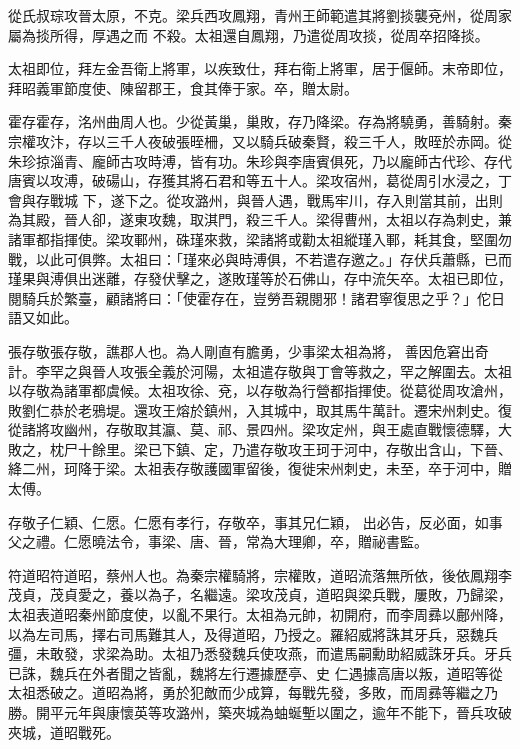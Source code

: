 \begin{pinyinscope}
 從氏叔琮攻晉太原，不克。梁兵西攻鳳翔，青州王師範遣其將劉掞襲兗州，從周家屬為掞所得，厚遇之而
 不殺。太祖還自鳳翔，乃遣從周攻掞，從周卒招降掞。



 太祖即位，拜左金吾衛上將軍，以疾致仕，拜右衛上將軍，居于偃師。末帝即位，拜昭義軍節度使、陳留郡王，食其俸于家。卒，贈太尉。



 霍存霍存，洺州曲周人也。少從黃巢，巢敗，存乃降梁。存為將驍勇，善騎射。秦宗權攻汴，存以三千人夜破張晊柵，又以騎兵破秦賢，殺三千人，敗晊於赤岡。從朱珍掠淄青、龐師古攻時溥，皆有功。朱珍與李唐賓俱死，乃以龐師古代珍、存代唐賓以攻溥，破碭山，存獲其將石君和等五十人。梁攻宿州，葛從周引水浸之，丁會與存戰城
 下，遂下之。從攻潞州，與晉人遇，戰馬牢川，存入則當其前，出則為其殿，晉人卻，遂東攻魏，取淇門，殺三千人。梁得曹州，太祖以存為刺史，兼諸軍都指揮使。梁攻鄆州，硃瑾來救，梁諸將或勸太祖縱瑾入鄆，耗其食，堅圍勿戰，以此可俱弊。太祖曰：「瑾來必與時溥俱，不若遣存邀之。」存伏兵蕭縣，已而瑾果與溥俱出迷離，存發伏擊之，遂敗瑾等於石佛山，存中流矢卒。太祖已即位，閱騎兵於繁臺，顧諸將曰：「使霍存在，豈勞吾親閱邪！諸君寧復思之乎？」佗日語又如此。



 張存敬張存敬，譙郡人也。為人剛直有膽勇，少事梁太祖為將，
 善因危窘出奇計。李罕之與晉人攻張全義於河陽，太祖遣存敬與丁會等救之，罕之解圍去。太祖以存敬為諸軍都虞候。太祖攻徐、兗，以存敬為行營都指揮使。從葛從周攻滄州，敗劉仁恭於老鴉堤。還攻王熔於鎮州，入其城中，取其馬牛萬計。遷宋州刺史。復從諸將攻幽州，存敬取其瀛、莫、祁、景四州。梁攻定州，與王處直戰懷德驛，大敗之，枕尸十餘里。梁已下鎮、定，乃遣存敬攻王珂于河中，存敬出含山，下晉、絳二州，珂降于梁。太祖表存敬護國軍留後，復徙宋州刺史，未至，卒于河中，贈太傅。



 存敬子仁穎、仁愿。仁愿有孝行，存敬卒，事其兄仁穎，
 出必告，反必面，如事父之禮。仁愿曉法令，事梁、唐、晉，常為大理卿，卒，贈祕書監。



 符道昭符道昭，蔡州人也。為秦宗權騎將，宗權敗，道昭流落無所依，後依鳳翔李茂貞，茂貞愛之，養以為子，名繼遠。梁攻茂貞，道昭與梁兵戰，屢敗，乃歸梁，太祖表道昭秦州節度使，以亂不果行。太祖為元帥，初開府，而李周彞以鄜州降，以為左司馬，擇右司馬難其人，及得道昭，乃授之。羅紹威將誅其牙兵，惡魏兵彊，未敢發，求梁為助。太祖乃悉發魏兵使攻燕，而遣馬嗣勳助紹威誅牙兵。牙兵已誅，魏兵在外者聞之皆亂，魏將左行遷據歷亭、史
 仁遇據高唐以叛，道昭等從太祖悉破之。道昭為將，勇於犯敵而少成算，每戰先發，多敗，而周彞等繼之乃勝。開平元年與康懷英等攻潞州，築夾城為蚰蜒塹以圍之，逾年不能下，晉兵攻破夾城，道昭戰死。




\end{pinyinscope}
